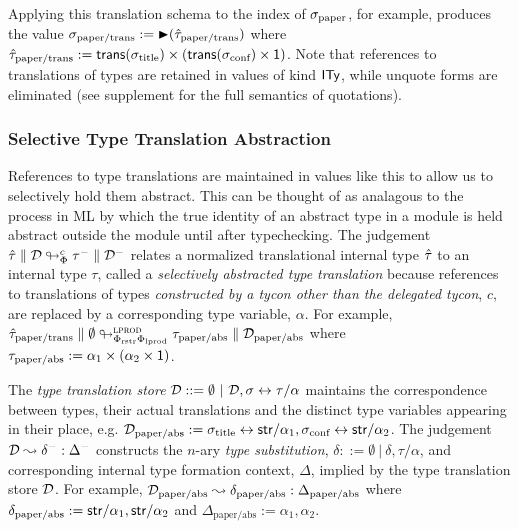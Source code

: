 \documentclass[preprint]{sigplanconf}
\newcommand{\moutput}{^{\color{gray}-}}
\begin{document}
Applying this translation schema to the index of $\sigma_\text{paper}$, for example, produces the value  $\sigma_\text{paper/trans} := {\blacktriangleright}(\hat{\tau}_\text{paper/trans})$ where $\small\qity_\text{paper/trans} := \srep{\stx{title}}\times(\srep{\stx{conf}}\times \iunit)$. Note  that references to translations of types are retained in values of kind ${\sf ITy}$, while unquote forms are eliminated (see supplement for the full semantics of quotations).%


\noindent
\subsubsection{Selective Type Translation Abstraction}\label{sec:selective-type-translation-abstraction}
\noindent
References to type translations are maintained in values like this to  allow us to selectively hold them abstract. This can be thought of as analagous to the process in ML by which the true identity of an abstract type in a module is held abstract outside the module until after typechecking. The judgement $\small\tdeabs{\Phi}{c}{\qity}{\memD}{\ity\moutput}{\memD\moutput}$ relates a normalized translational internal type $\hat{\tau}$ to an internal type $\tau$, called a \emph{selectively abstracted type translation} because references to translations of types \emph{constructed by a tycon other than the delegated tycon}, $c$, are replaced by a corresponding type variable, $\alpha$. For example, $\small\tdeabs{\Phi_\text{rstr}\Phi_\text{lprod}}{\tcvar{lprod}}{\qity_\text{paper/trans}}{\emptyset}{\tau_\text{paper/abs}}{\memD_\text{paper/abs}}$
where $\small\tau_\text{paper/abs} := \alpha_1 \times (\alpha_2 \times \iunit)$. 

The \emph{type translation store} $\mathcal{D} ::= \emptyset ~|~ \mathcal{D}, \sigma \leftrightarrow \tau/\alpha$ maintains the correspondence between types, their actual translations and the distinct type variables appearing in their place,  e.g. 
$\mathcal{D}_\text{paper/abs}  := \sigma_\text{title} \leftrightarrow {\sf str}/\alpha_1, \sigma_\text{conf} \leftrightarrow {\sf str}/\alpha_2$. The judgement $\memD \leadsto \delta\moutput : \Delta\moutput$ constructs the $n$-ary \emph{type substitution}, $\delta ::= \emptyset ~|~ \delta, \tau/\alpha$, and corresponding internal type formation context, $\Delta$, implied by the type translation store $\mathcal{D}$. For example, $\mathcal{D}_\text{paper/abs} \leadsto \delta_\text{paper/abs} : \Delta_\text{paper/abs}$ where $\delta_\text{paper/abs} := {\sf str}/\alpha_1, {\sf str}/\alpha_2$ and $\Delta_\text{paper/abs} := \alpha_1, \alpha_2$. 
\end{document}
